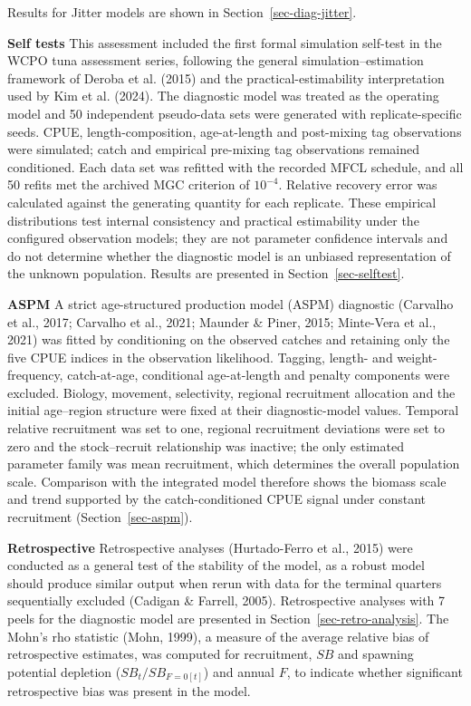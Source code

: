 \documentclass[
  english,
  a4paper,
  a4paper,
  11pt]{SCreport}
\begin{document}
Results for Jitter models are shown in Section~\ref{sec-diag-jitter}.

\textbf{Self tests} This assessment included the first formal simulation
self-test in the WCPO tuna assessment series, following the general
simulation--estimation framework of Deroba et al. (2015) and the
practical-estimability interpretation used by Kim et al. (2024). The
diagnostic model was treated as the operating model and 50 independent
pseudo-data sets were generated with replicate-specific seeds. CPUE,
length-composition, age-at-length and post-mixing tag observations were
simulated; catch and empirical pre-mixing tag observations remained
conditioned. Each data set was refitted with the recorded MFCL
 schedule, and all 50 refits met the archived MGC
criterion of \(10^{-4}\). Relative recovery error was calculated against
the generating quantity for each replicate. These empirical
distributions test internal consistency and practical estimability under
the configured observation models; they are not parameter confidence
intervals and do not determine whether the diagnostic model is an
unbiased representation of the unknown population. Results are presented
in Section~\ref{sec-selftest}.

\textbf{ASPM} A strict age-structured production model (ASPM) diagnostic
(Carvalho et al., 2017; Carvalho et al., 2021; Maunder \& Piner, 2015;
Minte-Vera et al., 2021) was fitted by conditioning on the observed
catches and retaining only the five CPUE indices in the observation
likelihood. Tagging, length- and weight-frequency, catch-at-age,
conditional age-at-length and penalty components were excluded. Biology,
movement, selectivity, regional recruitment allocation and the initial
age--region structure were fixed at their diagnostic-model values.
Temporal relative recruitment was set to one, regional recruitment
deviations were set to zero and the stock--recruit relationship was
inactive; the only estimated parameter family was mean recruitment,
which determines the overall population scale. Comparison with the
integrated model therefore shows the biomass scale and trend supported
by the catch-conditioned CPUE signal under constant recruitment
(Section~\ref{sec-aspm}).

\textbf{Retrospective} Retrospective analyses (Hurtado-Ferro et al.,
2015) were conducted as a general test of the stability of the model, as
a robust model should produce similar output when rerun with data for
the terminal quarters sequentially excluded (Cadigan \& Farrell, 2005).
Retrospective analyses with 7 peels for the diagnostic model are
presented in Section~\ref{sec-retro-analysis}. The Mohn's rho statistic
(Mohn, 1999), a measure of the average relative bias of retrospective
estimates, was computed for recruitment, \(SB\) and spawning potential
depletion (\(SB_t/SB_{F=0[t]}\)) and annual \(F\), to indicate whether
significant retrospective bias was present in the model.
\end{document}
